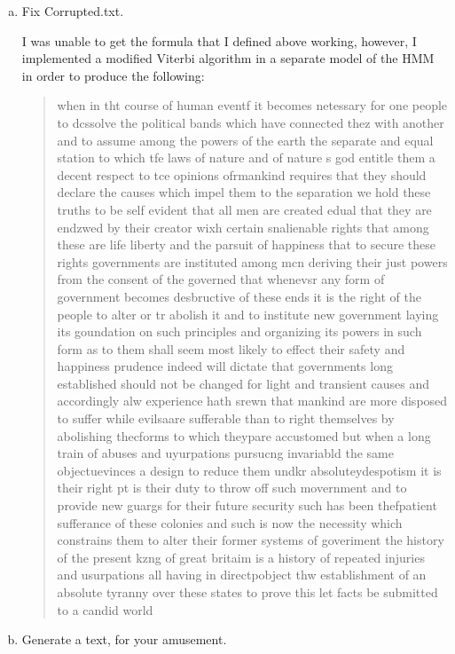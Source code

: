 \documentclass{article}
\newcommand\vtt[1]{{\normalfont\fontfamily{cmvtt}\selectfont #1}}
\begin{document}
\begin{enumerate}[(a)]
\item Fix \vtt{Corrupted.txt}.

I was unable to get the formula that I defined above working, however,
I implemented a modified Viterbi algorithm in a separate model of the
HMM in order to produce the following:

\begin{quote}
when in tht course of human eventf it becomes netessary for one people to dcssolve the political bands which have connected thez with another and to assume among the powers of the earth the separate and equal station to which tfe laws of nature and of nature s god entitle them a decent respect to tce opinions ofrmankind requires that they should declare the causes which impel them to the separation we hold these truths to be self evident that all men are created edual that they are endzwed by their creator wixh certain snalienable rights that among these are life liberty and the parsuit of happiness that to secure these rights governments are instituted among mcn deriving their just powers from the consent of the governed that whenevsr any form of government becomes desbructive of these ends it is the right of the people to alter or tr abolish it and to institute new government laying its goundation on such principles and organizing its powers in such form as to them shall seem most likely to effect their safety and happiness prudence indeed will dictate that governments long established should not be changed for light and transient causes and accordingly alw experience hath srewn that mankind are more disposed to suffer while evilsaare sufferable than to right themselves by abolishing thecforms to which theypare accustomed but when a long train of abuses and uyurpations pursucng invariabld the same objectuevinces a design to reduce them undkr absoluteydespotism it is their right pt is their duty to throw off such movernment and to provide new guargs for their future security such has been thefpatient sufferance of these colonies and such is now the necessity which constrains them to alter their former systems of goveriment the history of the present kzng of great britaim is a history of repeated injuries and usurpations all having in directpobject thw establishment of an absolute tyranny over these states to prove this let facts be submitted to a candid world
\end{quote}


\item Generate a text, for your amusement.


\end{enumerate}
\end{document}

